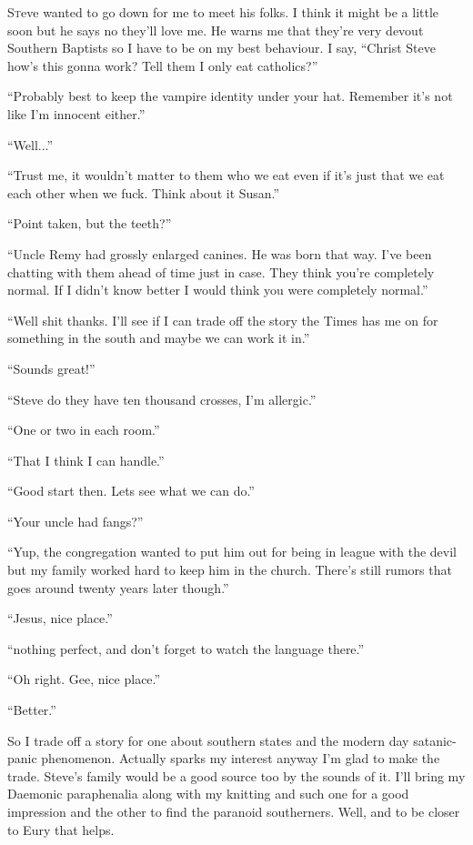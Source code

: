 \lettrine[lines=2,lraise=0]{S}teve wanted to go down for me to meet his folks. I think it might be a little soon but he says no they'll love me. He warns me that they're very devout Southern Baptists so I have to be on my best behaviour. I say, ``Christ Steve how's this gonna work? Tell them I only eat catholics?''

``Probably best to keep the vampire identity under your hat. Remember it's not like I'm innocent either.''

``Well...''

``Trust me, it wouldn't matter to them who we eat even if it's just that we eat each other when we fuck. Think about it Susan.''

``Point taken, but the teeth?''

``Uncle Remy had grossly enlarged canines. He was born that way. I've been chatting with them ahead of time just in case. They think you're completely normal. If I didn't know better I would think you were completely normal.''

``Well shit thanks. I'll see if I can trade off the story the Times has me on for something in the south and maybe we can work it in.''

``Sounds great!''

``Steve do they have ten thousand crosses, I'm allergic.''

``One or two in each room.''

``That I think I can handle.''

``Good start then. Lets see what we can do.''

``Your uncle had fangs?''

``Yup, the congregation wanted to put him out for being in league with the devil but my family worked hard to keep him in the church. There's still rumors that goes around twenty years later though.''

``Jesus, nice place.''

``nothing perfect, and don't forget to watch the language there.''

``Oh right. Gee, nice place.''

``Better.''

So I trade off a story for one about southern states and the modern day satanic-panic phenomenon. Actually sparks my interest anyway I'm glad to make the trade. Steve's family would be a good source too by the sounds of it. I'll bring my Daemonic paraphenalia along with my knitting and such one for a good impression and the other to find the paranoid southerners. Well, and to be closer to Eury that helps.


